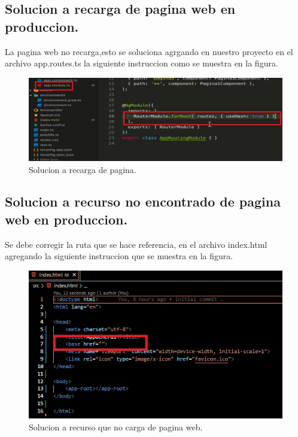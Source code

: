    \subsection{ Solucion a recarga de pagina web en produccion.}
   La pagina web no recarga,esto se soluciona agrgando en nuestro proyecto en el archivo app.routes.ts
   la siguiente instruccion como se muestra en la figura.
\begin{figure}[H] %
	\centering %
	\includegraphics[scale=0.55]{images/c3_6.jpg}
	\caption{Solucion a recarga de pagina.}
\end{figure}
 \subsection{ Solucion a recurso no encontrado de pagina web en produccion.}
 Se debe corregir la ruta que se hace referencia, en el archivo index.html agregando la siguiente instruccion que se muestra en la figura.
 \begin{figure}[H] %
 	\centering %
 	\includegraphics[scale=1.2]{images/c3_7.jpg}
 	\caption{Solucion a recurso que no carga de pagina web.}
 \end{figure}







